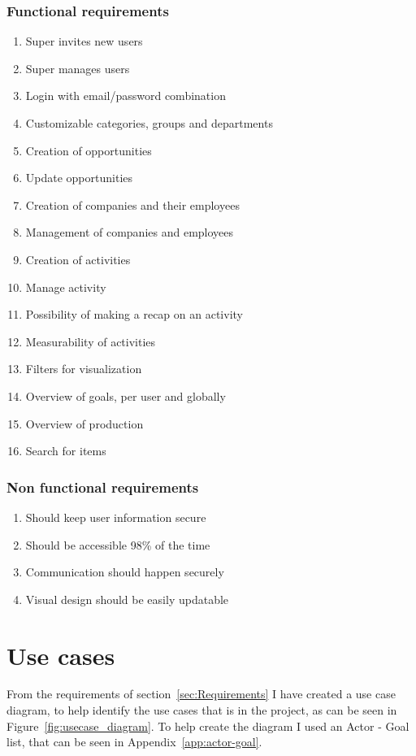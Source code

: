 \subsubsection{Functional requirements}
\label{subs:Functional requirements}
\begin{enumerate}[label=\textbf{F\arabic*}]
  \item Super invites new users
  \item Super manages users
  \item Login with email/password combination
  \item Customizable categories, groups and departments
  \item Creation of opportunities
  \item Update opportunities
  \item Creation of companies and their employees
  \item Management of companies and employees
  \item Creation of activities
  \item Manage activity
  \item Possibility of making a recap on an activity
  \item Measurability of activities
  \item Filters for visualization
  \item Overview of goals, per user and globally
  \item Overview of production
  \item Search for items
\end{enumerate}

\subsubsection{Non functional requirements}
\label{subs:Non functional requirements}
\begin{enumerate}[label=\textbf{NF\arabic*}]
  \item Should keep user information secure
  \item Should be accessible 98\% of the time
  \item Communication should happen securely
  \item Visual design should be easily updatable
\end{enumerate}


\section{Use cases}
\label{sec:Use cases}
From the requirements of section~\ref{sec:Requirements} I have created a use case diagram, to help identify the use cases that is in the project, as can be seen in Figure~\ref{fig:usecase_diagram}. To help create the diagram I used an Actor - Goal list, that can be seen in Appendix~\ref{app:actor-goal}.

